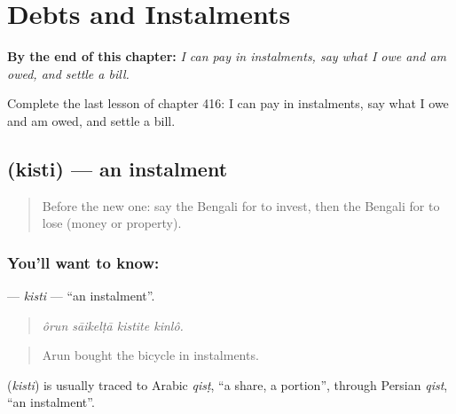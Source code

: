 
\chapter{Debts and Instalments}
\label{ch:bn-debts-and-instalments}

\begin{chapteropening}
\textbf{By the end of this chapter:} \emph{I can pay in instalments, say what I owe and am owed, and settle a bill.}

Complete the last lesson of chapter 416: I can pay in instalments, say what I owe and am owed, and settle a bill.
\end{chapteropening}

\section[\texorpdfstring{\bn{কিস্তি} (kisti)}{কিস্তি (kisti)}]{ (kisti) — an instalment}

\label{lesson:BN-C416-kisti}



\begin{quote}
Before the new one: say the Bengali for to invest, then the Bengali for to lose (money or property).
\end{quote}

\subsection*{You'll want to know: }
\textbf{} — \emph{kisti} — \textquotedblleft{}an instalment\textquotedblright{}.

\begin{quote}
   
\end{quote}

\begin{quote}
\emph{ôrun sāikelṭā kistite kinlô.}
\end{quote}

\begin{quote}
Arun bought the bicycle in instalments.
\end{quote}

\begin{cousinweb}
\textbf{} (\emph{kisti}) is usually traced to Arabic \emph{qisṭ}, \textquotedblleft{}a share, a portion\textquotedblright{}, through Persian \emph{qist}, \textquotedblleft{}an instalment\textquotedblright{}.
\end{cousinweb}

